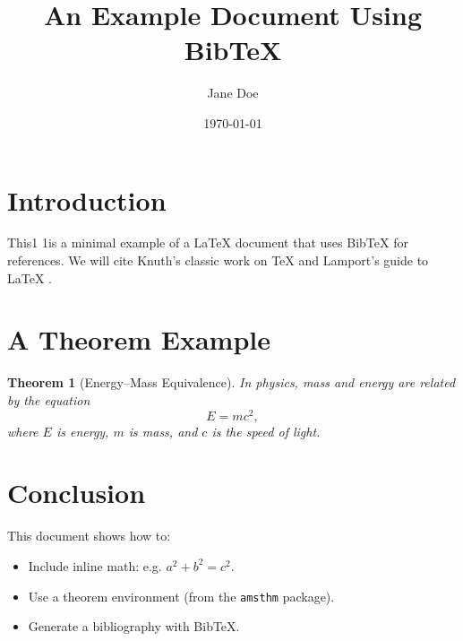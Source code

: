 \documentclass{article}
\newtheorem{theorem}{Theorem}
\begin{document}
\title{An Example Document Using Bib\TeX}
\author{Jane Doe}
\date{\today}
\maketitle

\section{Introduction}

This1 1is a minimal example of a \LaTeX{} document that uses Bib\TeX{} for references.
We will cite Knuth’s classic work on \TeX{} \cite{knuth1984texbook} and Lamport’s guide to \LaTeX{} \cite{lamport1994latex}.

\section{A Theorem Example}

\begin{theorem}[Energy–Mass Equivalence]
In physics, mass and energy are related by the equation
\[ E = mc^2, \]
where $E$ is energy, $m$ is mass, and $c$ is the speed of light.
\end{theorem}

\section{Conclusion}

This document shows how to:
\begin{itemize}
  \item Include inline math: e.g. $a^2 + b^2 = c^2$.
  \item Use a theorem environment (from the {\tt amsthm} package).
  \item Generate a bibliography with Bib\TeX{}.
\end{itemize}



\end{document}
